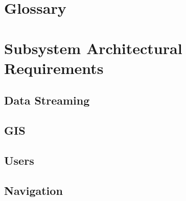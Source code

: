 \documentclass{article}
\begin{document}
\section{Glossary}


\section{Subsystem Architectural Requirements}
\clearpage
  \subsection{Data Streaming}
	
\clearpage
  \subsection{GIS}
	
\clearpage
  \subsection{Users}
	
\clearpage
  \subsection{Navigation}
	
\end{document}
